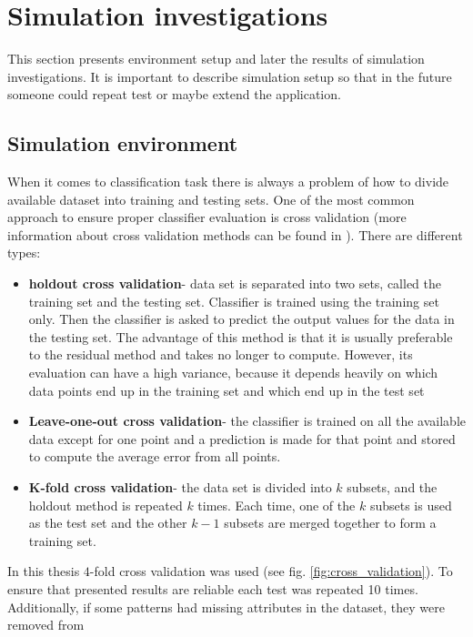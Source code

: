 \section{Simulation investigations}
This section presents environment setup and later the results of simulation
investigations. It is important to describe simulation setup so that in the
future someone could repeat test or maybe extend the application.
\label{cha:Simulation_investugations}
\subsection{Simulation environment}
When it comes to classification task there is always a problem of how to
divide available dataset into training and testing sets. One of the most common 
approach to ensure proper classifier evaluation is cross validation (more
information about cross validation methods can be found in \cite{bib41}). 
There are different types:
\begin{itemize}
    \item \textbf{holdout cross validation}- data set is separated into two sets, called the 
        training set and the testing set. Classifier is trained using the 
        training set only. Then the classifier is asked to predict the output 
        values for the data in the testing set. The advantage of this method is 
        that it is usually preferable to the residual method and takes no longer 
        to compute. However, its evaluation can have a high variance, because
        it depends heavily on which data points end up in the training set and 
        which end up in the test set
    \item \textbf{Leave-one-out cross validation}- the classifier is trained on all the
        available data except for one point and a prediction is made for that
        point and stored to compute the average error from all points. 
    \item \textbf{K-fold cross validation}- the data set is divided into $k$ subsets, 
        and the holdout method is repeated $k$ times. Each time, one of the $k$ subsets 
        is used as the test set and the other $k-1$ subsets are merged together to form 
        a training set.
\end{itemize}
In this thesis $4$-fold cross validation was used (see fig.
\ref{fig:cross_validation}). To ensure that presented
results are reliable each test was repeated 10 times. Additionally, if some
patterns had missing attributes in the dataset, they were removed from
